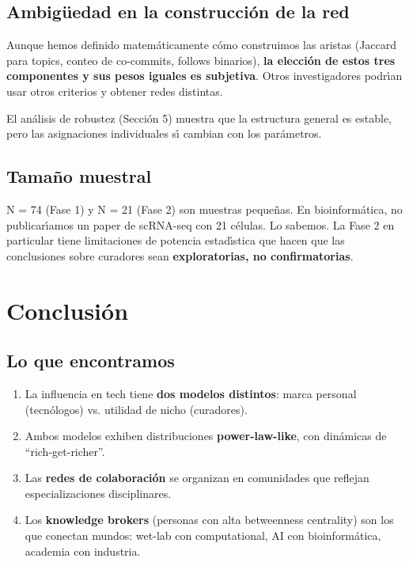\documentclass[11pt]{article}
\begin{document}
\subsection{Ambig\"{u}edad en la construcci\'{o}n de la red}

Aunque hemos definido matem\'{a}ticamente c\'{o}mo construimos las aristas (Jaccard para topics, conteo de co-commits, follows binarios), \textbf{la elecci\'{o}n de estos tres componentes y sus pesos iguales es subjetiva}. Otros investigadores podr\'{\i}an usar otros criterios y obtener redes distintas.

El an\'{a}lisis de robustez (Secci\'{o}n 5) muestra que la estructura general es estable, pero las asignaciones individuales s\'{\i} cambian con los par\'{a}metros.

\subsection{Tama\~{n}o muestral}

N = 74 (Fase 1) y N = 21 (Fase 2) son muestras peque\~{n}as. En bioinform\'{a}tica, no publicar\'{\i}amos un paper de scRNA-seq con 21 c\'{e}lulas. Lo sabemos. La Fase 2 en particular tiene limitaciones de potencia estad\'{\i}stica que hacen que las conclusiones sobre curadores sean \textbf{exploratorias, no confirmatorias}.


\section{Conclusi\'{o}n}

\subsection{Lo que encontramos}

\begin{enumerate}
    \item La influencia en tech tiene \textbf{dos modelos distintos}: marca personal (tecn\'{o}logos) vs. utilidad de nicho (curadores).
    \item Ambos modelos exhiben distribuciones \textbf{power-law-like}, con din\'{a}micas de ``rich-get-richer''.
    \item Las \textbf{redes de colaboraci\'{o}n} se organizan en comunidades que reflejan especializaciones disciplinares.
    \item Los \textbf{knowledge brokers} (personas con alta betweenness centrality) son los que conectan mundos: wet-lab con computational, AI con bioinform\'{a}tica, academia con industria.
\end{enumerate}
\end{document}
